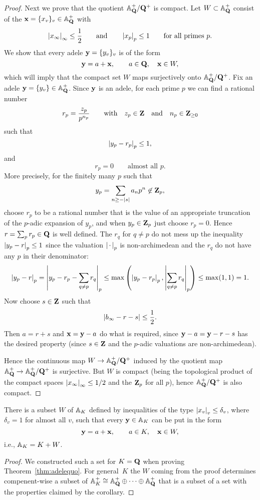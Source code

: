 \begin{proof}
Next we prove that the quotient $\AA_\Q^+/\Q^+$ is compact.
Let $W\subset \AA_\Q^+$ consist of the $\bx=\{x_v\}_v\in \AA_\Q^+$
with 
$$
  \abs{x_\infty}_\infty \leq \frac{1}{2}\qquad\text{and}\qquad
   \abs{x_p}_p \leq 1\qquad\text{for all primes $p$}.
$$
We show that every adele $\by=\{y_v\}_v$ is of the form
$$
  \by = a + \bx, \qquad a\in \Q, \quad \bx\in W,
$$
which will imply that the compact set $W$ maps surjectively
onto $\AA_\Q^+ / \Q^+$.
Fix an adele $\by=\{y_v\}\in\AA_\Q^+$.  Since $\by$
is an adele, for each prime $p$ we can find
a rational number
$$
  r_p = \frac{z_p}{p^{n_p}}
\qquad \text{with} \quad z_p \in \Z \quad \text{and} \quad n_p \in \Z_{\geq 0}
$$
such that 
$$
  \abs{y_p - r_p}_p \leq 1,
$$
and 
$$
  r_p = 0 \qquad \text{almost all $p$}.
$$
More precisely, for the finitely
many $p$ such that $$y_p = \sum_{n\geq -\abs{s}} a_np^n \not\in\Z_p,$$ choose
$r_p$ to be a rational number that is the value of an appropriate truncation
of the $p$-adic expansion of $y_p$, and 
when $y_p\in \Z_p$ just choose $r_p = 0$.
Hence $r=\sum_{p} r_p\in\Q$ is well defined.
The $r_q$ for $q\neq p$ do not mess up the inequality 
$\abs{y_p - r}_p \leq 1$ since the
valuation $\absspc_p$ is non-archimedean and the $r_q$ do not have any $p$ in
their denominator:
$$\abs{y_p  - r}_p 
   = \abs{y_p - r_p - \sum_{q\neq p} r_q}_p
   \leq \max\left(\abs{y_p - r_p}_p, \abs{\sum_{q\neq p} r_q}_p\right)
   \leq \max(1,1) = 1.
$$
Now choose $s\in\Z$ such that 
$$
  \abs{b_\infty - r-s} \leq \frac{1}{2}.
$$
Then $a=r+s$ and $\bx = \by - a$ do what is required,
since $\by - a = \by - r - s$ has the desired property
(since $s\in\Z$ and the $p$-adic valuations are
non-archimedean).

Hence the continuous map $W\to \AA_\Q^+/\Q^+$ induced by the quotient
map $\AA_\Q^+ \to \AA_\Q^+/\Q^+$ is surjective.  But $W$ is compact
(being the topological product of the compact spaces
$\abs{x_\infty}_\infty\leq 1/2$ and the $\Z_p$ for all $p$), hence
$\AA_\Q^+/\Q^+$ is also compact. 
\end{proof}

\begin{corollary}\label{cor:subsetW}
There is a subset $W$ of $\AA_K$ defined by inequalities of the
type $\abs{x_v}_v \leq \delta_v$, where $\delta_v=1$
for almost all $v$, such that every $\by\in\AA_K$ can
be put in the form
$$
  \by = a + \bx, \qquad a\in K, \quad \bx \in W,
$$
i.e., $\AA_K = K + W$.
\end{corollary}
\begin{proof}
  We constructed such a set for $K=\Q$ when proving
  Theorem~\ref{thm:adelequo}.  For general~$K$ the $W$ coming from the
  proof determines compenent-wise a subset of $\AA_K^+\isom
  \AA_\Q^+\oplus \cdots \oplus \AA_\Q^+$ that is a subset of a set
  with the properties claimed by the corollary.
\end{proof}

